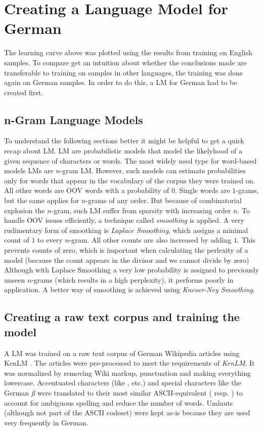 \section{Creating a Language Model for German}\label{lm}

The learning curve above was plotted using the results from training on English samples. To compare get an intuition about whether the conclusions made are transferable to training on samples in other languages, the training was done again on German samples. In order to do this, a \ac{LM} for German had to be created first. 

\subsection{n-Gram Language Models}

To understand the following sections better it might be helpful to get a quick recap about \ac{LM}. \ac{LM} are probabilistic models that model the likelyhood of a given sequence of characters or words. The most widely used type for word-based models \ac{LM}s are $n$-gram \ac{LM}. However, such models can estimate probabilities only for words that appear in the vocabulary of the corpus they were trained on. All other words are \ac{OOV} words with a probability of $0$. Single words are $1$-grams, but the same applies for $n$-grams of any order. But because of combinatorial explosion the $n$-gram, such \ac{LM} suffer from sparsity with increasing order $n$. To handle \ac{OOV} issues efficiently, a technique called \textit{smoothing} is applied. A very rudimentary form of smoothing is \textit{Laplace Smoothing}, which assigns a minimal count of $1$ to every $n$-gram. All other counts are also increased by adding $1$. This prevents counts of zero, which is important when calculating the perlexity of a model (because the count appears in the divisor and we cannot divide by zero) Although with Laplace Smoothing a very low probability is assigned to previously unseen $n$-grams (which results in a high perplexity), it performs poorly in application. A better way of smoothing is achieved using \textit{Kneser-Ney Smoothing}.

\subsection{Creating a raw text corpus and training the model}

A LM was trained on a raw text corpus of German Wikipedia articles using KenLM \parencite{kenlm}. The articles were pre-processed to meet the requirements of \textit{KenLM}.
It was normalized by removing Wiki markup, punctuation and making everything lowercase. Accentuated characters (like , etc.) and special characters like the German \textit{ß} were translated to their most similar ASCII-equivalent ( resp. ) to account for ambiguous spelling and reduce the number of words. Umlauts (although not part of the ASCII codeset) were kept as-is because they are used very frequently in German. 


